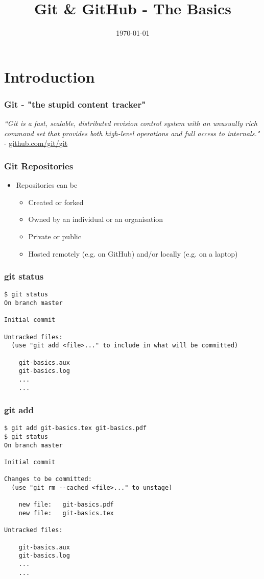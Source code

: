 \documentclass{beamer}
\title[Git]{Git \& GitHub - The Basics} %
\author{} %
\institute[] %
{
 \\ %
\medskip
\textit{chris@cjwfuller.com}
}
\date{\today}
\begin{document}
\begin{frame}
\titlepage
\end{frame}

\section{Introduction}

\begin{frame}
\frametitle{Git - "the stupid content tracker"}
\textit{``Git is a fast, scalable, distributed revision control system with an unusually rich command set that provides both high-level operations and full access to internals."} - \url{github.com/git/git}
\end{frame}


\begin{frame}
\frametitle{Git Repositories}
\begin{itemize}
	\item Repositories can be
	\begin{itemize}
		\item Created or forked
		\item Owned by an individual or an organisation
		\item Private or public
		\item Hosted remotely (e.g. on GitHub) and/or locally (e.g. on a laptop)
	\end{itemize}
\end{itemize}
\end{frame}


\begin{frame}[fragile]
\frametitle{git status}
	\scriptsize
	\begin{verbatim}
$ git status
On branch master

Initial commit

Untracked files:
  (use "git add <file>..." to include in what will be committed)

	git-basics.aux
	git-basics.log
	...
	...
	\end{verbatim}
\end{frame}


\begin{frame}[fragile]
\frametitle{git add}
	\scriptsize
	\begin{verbatim}
$ git add git-basics.tex git-basics.pdf
$ git status
On branch master

Initial commit

Changes to be committed:
  (use "git rm --cached <file>..." to unstage)

	new file:   git-basics.pdf
	new file:   git-basics.tex

Untracked files:

	git-basics.aux
	git-basics.log
	...
	...
	\end{verbatim}
\end{frame}
\end{document}
